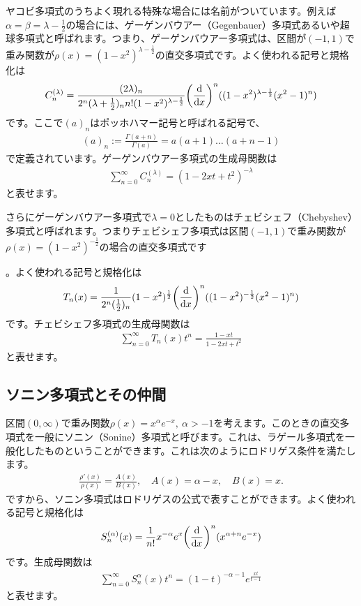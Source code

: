 \documentclass[report,paper=a4, fontsize=12pt, line_length=16cm, number_of_lines=33,dvipdfmx]{jlreq}
\numberwithin{equation}{section}
\begin{document}
ヤコビ多項式のうちよく現れる特殊な場合には名前がついています。例えば$\alpha=\beta=\lambda-\frac12$の場合には、ゲーゲンバウアー（Gegenbauer）多項式あるいや超球多項式と呼ばれます。つまり、ゲーゲンバウアー多項式は、区間が$(-1,1)$で重み関数が$\rho(x)=(1-x^2)^{\lambda-\frac12}$の直交多項式です。よく使われる記号と規格化は
\begin{align}
  C^{(\lambda)}_{n}=\frac{(2\lambda)_n}{2^n (\lambda+\frac12)_n n!(1-x^2)^{\lambda-\frac12}}
  \qty(\dv{x})^n((1-x^2)^{\lambda-\frac12}(x^2-1)^n)
\end{align}
です。ここで$(a)_n$はポッホハマー記号と呼ばれる記号で、
\begin{align}
  (a)_n:=\frac{\Gamma(a+n)}{\Gamma(a)}=a(a+1)\dots(a+n-1)
\end{align}
で定義されています。ゲーゲンバウアー多項式の生成母関数は
\begin{align}
  \sum_{n=0}^{\infty}C^{(\lambda)}_{n}=(1-2xt+t^2)^{-\lambda}
\end{align}
と表せます。

さらにゲーゲンバウアー多項式で$\lambda=0$としたものはチェビシェフ（Chebyshev）多項式と呼ばれます。つまりチェビシェフ多項式は区間$(-1,1)$で重み関数が$\rho(x)=(1-x^2)^{-\frac12}$の場合の直交多項式です

。よく使われる記号と規格化は
\begin{align}
  T_n(x)=\frac{1}{2^n(\frac12)_n}(1-x^2)^{\frac12}
  \qty(\dv{x})^n((1-x^2)^{-\frac12}(x^2-1)^n)
\end{align}
です。チェビシェフ多項式の生成母関数は
\begin{align}
  \sum_{n=0}^{\infty}T_n(x)t^n = \frac{1-xt}{1-2xt+t^2}
\end{align}
と表せます。

\subsection{ソニン多項式とその仲間}
区間$(0,\infty)$で重み関数$\rho(x)=x^{\alpha}e^{-x},\ \alpha>-1$を考えます。このときの直交多項式を一般にソニン（Sonine）多項式と呼びます。これは、ラゲール多項式を一般化したものということができます。これは次のようにロドリゲス条件を満たします。
\begin{align}
  \frac{\rho'(x)}{\rho(x)}=\frac{A(x)}{B(x)},\quad A(x)=\alpha-x,\quad B(x)=x.
\end{align}
ですから、ソニン多項式はロドリゲスの公式で表すことができます。よく使われる記号と規格化は
\begin{align}
  S^{(\alpha)}_{n}(x)=\frac{1}{n!}x^{-\alpha}e^{x}\qty(\dv{x})^n(x^{\alpha+n}e^{-x})
\end{align}
です。生成母関数は
\begin{align}
  \sum_{n=0}^{\infty}S^{\alpha}_{n}(x)t^n=(1-t)^{-\alpha-1}e^{\frac{xt}{t-1}}
\end{align}
と表せます。
\end{document}

